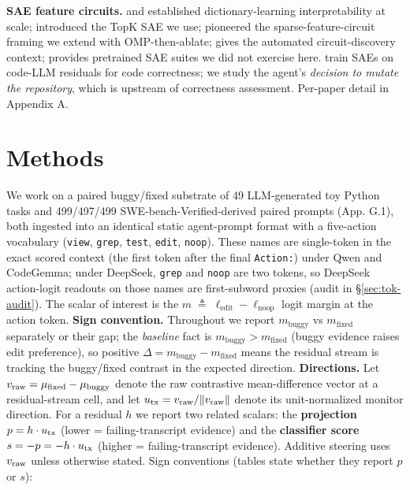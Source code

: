 \documentclass[
  11pt,
  a4paper]{article}
\begin{document}
\textbf{SAE feature circuits.} \citet{bricken2023monosemanticity} and
\citet{templeton2024scaling} established dictionary-learning
interpretability at scale; \citet{gao2024scaling} introduced the TopK
SAE we use; \citet{marks2024sparsefeaturecircuits} pioneered the
sparse-feature-circuit framing we extend with OMP-then-ablate;
\citet{conmy2023acdc} gives the automated circuit-discovery context;
\citet{lieberum2024gemmascope} provides pretrained SAE suites we did not
exercise here. \citet{tahimic2025codecorrectness} train SAEs on code-LLM
residuals for code correctness; we study the agent's \emph{decision to
mutate the repository}, which is upstream of correctness assessment.
Per-paper detail in Appendix A.

\section{Methods}\label{methods}

We work on a paired buggy/fixed substrate of 49 LLM-generated toy Python
tasks and 499/497/499 SWE-bench-Verified-derived paired prompts (App.
G.1), both ingested into an identical static agent-prompt format with a
five-action vocabulary (\texttt{view}, \texttt{grep}, \texttt{test},
\texttt{edit}, \texttt{noop}). These names are single-token in the exact
scored context (the first token after the final \texttt{Action:}) under
Qwen and CodeGemma; under DeepSeek, \texttt{grep} and \texttt{noop} are
two tokens, so DeepSeek action-logit readouts on those names are
first-subword proxies (audit in \S{}\ref{sec:tok-audit}). The scalar of
interest is the
\(m \;\triangleq\; \ell_{\text{edit}} - \ell_{\text{noop}}\) logit
margin at the action token. \textbf{Sign convention.} Throughout we
report \(m_{\text{buggy}}\) vs \(m_{\text{fixed}}\) separately or their
gap; the \emph{baseline} fact is \(m_{\text{buggy}} > m_{\text{fixed}}\)
(buggy evidence raises edit preference), so positive
\(\Delta = m_{\text{buggy}} - m_{\text{fixed}}\) means the residual
stream is tracking the buggy/fixed contrast in the expected direction.
\textbf{Directions.} Let \(v_{\rm raw}=\mu_{\rm fixed}-\mu_{\rm buggy}\)
denote the raw contrastive mean-difference vector at a residual-stream
cell, and let \(u_{\rm tx}=v_{\rm raw}/\|v_{\rm raw}\|\) denote its
unit-normalized monitor direction. For a residual \(h\) we report two
related scalars: the \textbf{projection} \(p=h\cdot u_{\rm tx}\) (lower
= failing-transcript evidence) and the \textbf{classifier score}
\(s=-p=-h\cdot u_{\rm tx}\) (higher = failing-transcript evidence).
Additive steering uses \(v_{\rm raw}\) unless otherwise stated. Sign
conventions (tables state whether they report \(p\) or \(s\)):
\end{document}

